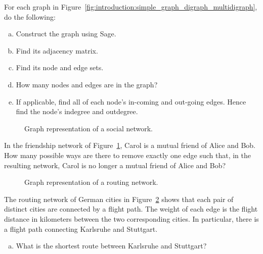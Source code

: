 \begin{problem}
\item For each graph in
  Figure~\ref{fig:introduction:simple_graph_digraph_multidigraph}, do
  the following:
  \begin{enumerate}[(a)]
  \item Construct the graph using Sage.

  \item Find its adjacency matrix.

  \item Find its node and edge sets.

  \item How many nodes and edges are in the graph?

  \item If applicable, find all of each node's in-coming and out-going
    edges. Hence find the node's indegree and outdegree.
  \end{enumerate}

  \begin{figure}[!htbp]
  \centering
  
  \caption{Graph representation of a social network.}
  \label{fig:introduction:social_network}
  \end{figure}

\item In the friendship network of
  Figure~\ref{fig:introduction:social_network}, Carol is a mutual
  friend of Alice and Bob. How many possible ways are there to remove
  exactly one edge such that, in the resulting network, Carol is no
  longer a mutual friend of Alice and Bob?

  \begin{figure}[!htbp]
  \centering
  
  \caption{Graph representation of a routing network.}
  \label{fig:introduction:routing_network}
  \end{figure}

\item The routing network of German cities in
  Figure~\ref{fig:introduction:routing_network} shows that each pair
  of distinct cities are connected by a flight path. The weight of
  each edge is the flight distance in kilometers between the two
  corresponding cities. In particular, there is a flight path
  connecting Karlsruhe and Stuttgart.
  \begin{enumerate}[(a)]
  \item What is the shortest route between Karlsruhe and Stuttgart?


\end{enumerate}
\end{problem}
